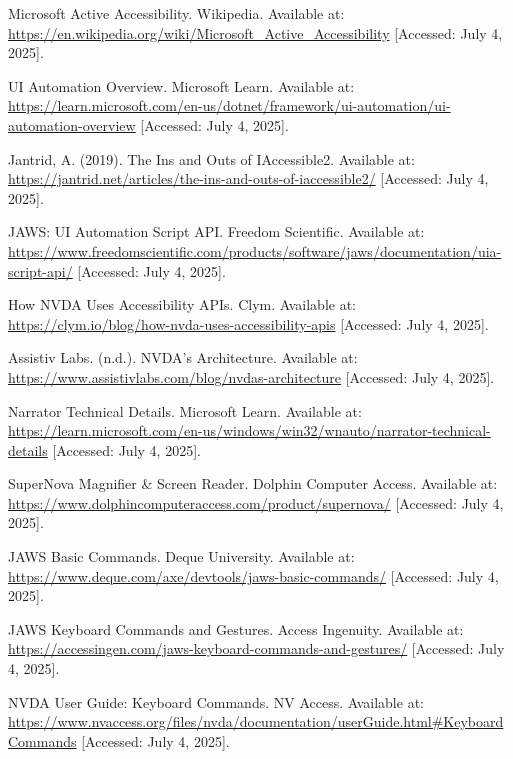 \begin{thebibliography}{99}

 Microsoft Active Accessibility. Wikipedia. Available at: \url{https://en.wikipedia.org/wiki/Microsoft_Active_Accessibility} [Accessed: July 4, 2025].

 UI Automation Overview. Microsoft Learn. Available at: \url{https://learn.microsoft.com/en-us/dotnet/framework/ui-automation/ui-automation-overview} [Accessed: July 4, 2025].

 Jantrid, A. (2019). The Ins and Outs of IAccessible2. Available at: \url{https://jantrid.net/articles/the-ins-and-outs-of-iaccessible2/} [Accessed: July 4, 2025].

 JAWS: UI Automation Script API. Freedom Scientific. Available at: \url{https://www.freedomscientific.com/products/software/jaws/documentation/uia-script-api/} [Accessed: July 4, 2025].

 How NVDA Uses Accessibility APIs. Clym. Available at: \url{https://clym.io/blog/how-nvda-uses-accessibility-apis} [Accessed: July 4, 2025].

 Assistiv Labs. (n.d.). NVDA's Architecture. Available at: \url{https://www.assistivlabs.com/blog/nvdas-architecture} [Accessed: July 4, 2025].

 Narrator Technical Details. Microsoft Learn. Available at: \url{https://learn.microsoft.com/en-us/windows/win32/wnauto/narrator-technical-details} [Accessed: July 4, 2025].

 SuperNova Magnifier \& Screen Reader. Dolphin Computer Access. Available at: \url{https://www.dolphincomputeraccess.com/product/supernova/} [Accessed: July 4, 2025].

 JAWS Basic Commands. Deque University. Available at: \url{https://www.deque.com/axe/devtools/jaws-basic-commands/} [Accessed: July 4, 2025].

 JAWS Keyboard Commands and Gestures. Access Ingenuity. Available at: \url{https://accessingen.com/jaws-keyboard-commands-and-gestures/} [Accessed: July 4, 2025].

 NVDA User Guide: Keyboard Commands. NV Access. Available at: \url{https://www.nvaccess.org/files/nvda/documentation/userGuide.html#KeyboardCommands} [Accessed: July 4, 2025].


\end{thebibliography}

